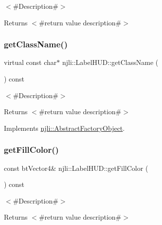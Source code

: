 $<$\#\+Description\#$>$

\begin{DoxyReturn}{Returns}
$<$\#return value description\#$>$ 
\end{DoxyReturn}
\mbox{\label{classnjli_1_1_label_h_u_d_aa0887086f1e2ad7f2c33e87b1887e5a7}} 
\subsubsection{\texorpdfstring{get\+Class\+Name()}{getClassName()}}
{\footnotesize\ttfamily virtual const char$\ast$ njli\+::\+Label\+H\+U\+D\+::get\+Class\+Name (\begin{DoxyParamCaption}{ }\end{DoxyParamCaption}) const\hspace{0.3cm}{\ttfamily [virtual]}}

$<$\#\+Description\#$>$

\begin{DoxyReturn}{Returns}
$<$\#return value description\#$>$ 
\end{DoxyReturn}


Implements \mbox{\hyperlink{classnjli_1_1_abstract_factory_object_af4151e41b80d5bc3fc42822c67fc2278}{njli\+::\+Abstract\+Factory\+Object}}.

\mbox{\label{classnjli_1_1_label_h_u_d_a3098da90340c9cbbe8ec1c1f35ab18d4}} 
\subsubsection{\texorpdfstring{get\+Fill\+Color()}{getFillColor()}}
{\footnotesize\ttfamily const bt\+Vector4\& njli\+::\+Label\+H\+U\+D\+::get\+Fill\+Color (\begin{DoxyParamCaption}{ }\end{DoxyParamCaption}) const}

$<$\#\+Description\#$>$

\begin{DoxyReturn}{Returns}
$<$\#return value description\#$>$ 
\end{DoxyReturn}
\mbox{\label{classnjli_1_1_label_h_u_d_a14780157dcd0ba8aedbdcfe9731f8117}} 

